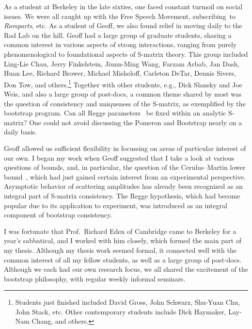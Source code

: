 \documentclass[11pt, oneside]{article}   	%
\newcommand{\<}{\langle}
\renewcommand{\>}{\rangle}
\numberwithin{equation}{section}
\numberwithin{figure}{section}
\begin{document}
As a student at Berkeley in the late sixties, one faced constant turmoil on social issues. We were all caught up with the Free Speech Movement, \mbox{subscribing to} \mbox{{\it Ramparts}}, etc. As a student of Geoff, we also found relief in moving daily to the Rad Lab on the hill.   Geoff had a large group of graduate students, sharing a common interest in various aspects of strong interactions, ranging from purely phenomenological to foundational aspects of S-matrix theory. This group included Ling-Lie Chau, Jerry Finkelstein, Jiunn-Ming Wang,  Farzam Arbab, Jan Dash, Huan Lee, Richard Brower, Michael Misheloff, Carleton DeTar, Dennis Sivers, Don Tow, and others.\footnote{Students just finished included David Gross, John Schwarz, Shu-Yuan Chu, John Stack,  etc. Other contemporary students include Dick Haymaker,  Lay-Nam Chang, and others.}  Together with other students, e.g., Dick Slansky and Joe Weis, and also a large  group of post-docs,  a common theme shared by most  was the question of consistency and uniqueness of the S-matrix, as exemplified by the  bootstrap program\cite{Chew:1963zza,DHS}. Can all Regge parameters~\cite{Mandelstam:1968zza} be fixed within an analytic S-matrix? One could not avoid discussing the Pomeron and Bootstrap nearly on a daily basis.

Geoff allowed us sufficient flexibility in focussing on areas of particular interest of our own.  I began my work when Geoff suggested that I take a look at various questions of bounds, and, in particular, the question of the Cerulus--Martin lower bound~\cite{Tan:1967a}, which had just gained certain interest from an experimental perspective. Asymptotic behavior of scattering amplitudes has already been recognized as an integral part of S-matrix consistency.  The Regge hypothesis, which had become popular due to its application to experiment,  was  introduced as an integral component of bootstrap consistency\cite{Chew:1963zza}.  

I was fortunate that Prof.~Richard Eden of Cambridge came to Berkeley for a year's sabbatical, and I worked with him closely, which formed the main part of my thesis. Although my thesis work  seemed formal, it connected well with the common interest of  all my fellow students, as well as a large group of post-docs.  Although we each had our own research focus, we all shared the excitement of the bootstrap philosophy, with regular weekly informal seminars.   
\end{document}
